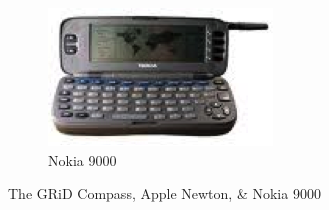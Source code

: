 \documentclass[12pt, a4paper, twoside]{book}
\begin{document}
\begin{figure}[htb]
\begin{subfigure}[b]{0.3\textwidth}
                \includegraphics[width=\textwidth]{images/nokia-9000}
                \caption{Nokia 9000}
                \label{fig:nokia-9000}
        \end{subfigure}
        \caption{The GRiD Compass, Apple Newton, \& Nokia 9000}\label{fig:early-mobile-platforms-1}
\end{figure}
\end{document}
